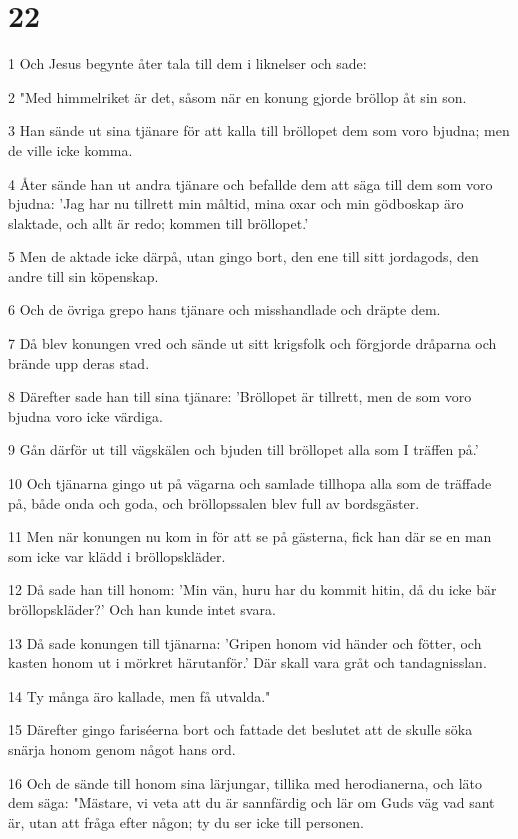 \chapter{22}

\par 1 Och Jesus begynte åter tala till dem i liknelser och sade:
\par 2 "Med himmelriket är det, såsom när en konung gjorde bröllop åt sin son.
\par 3 Han sände ut sina tjänare för att kalla till bröllopet dem som voro bjudna; men de ville icke komma.
\par 4 Åter sände han ut andra tjänare och befallde dem att säga till dem som voro bjudna: 'Jag har nu tillrett min måltid, mina oxar och min gödboskap äro slaktade, och allt är redo; kommen till bröllopet.'
\par 5 Men de aktade icke därpå, utan gingo bort, den ene till sitt jordagods, den andre till sin köpenskap.
\par 6 Och de övriga grepo hans tjänare och misshandlade och dräpte dem.
\par 7 Då blev konungen vred och sände ut sitt krigsfolk och förgjorde dråparna och brände upp deras stad.
\par 8 Därefter sade han till sina tjänare: 'Bröllopet är tillrett, men de som voro bjudna voro icke värdiga.
\par 9 Gån därför ut till vägskälen och bjuden till bröllopet alla som I träffen på.'
\par 10 Och tjänarna gingo ut på vägarna och samlade tillhopa alla som de träffade på, både onda och goda, och bröllopssalen blev full av bordsgäster.
\par 11 Men när konungen nu kom in för att se på gästerna, fick han där se en man som icke var klädd i bröllopskläder.
\par 12 Då sade han till honom: 'Min vän, huru har du kommit hitin, då du icke bär bröllopskläder?' Och han kunde intet svara.
\par 13 Då sade konungen till tjänarna: 'Gripen honom vid händer och fötter, och kasten honom ut i mörkret härutanför.' Där skall vara gråt och tandagnisslan.
\par 14 Ty många äro kallade, men få utvalda."
\par 15 Därefter gingo fariséerna bort och fattade det beslutet att de skulle söka snärja honom genom något hans ord.
\par 16 Och de sände till honom sina lärjungar, tillika med herodianerna, och läto dem säga: "Mästare, vi veta att du är sannfärdig och lär om Guds väg vad sant är, utan att fråga efter någon; ty du ser icke till personen.
